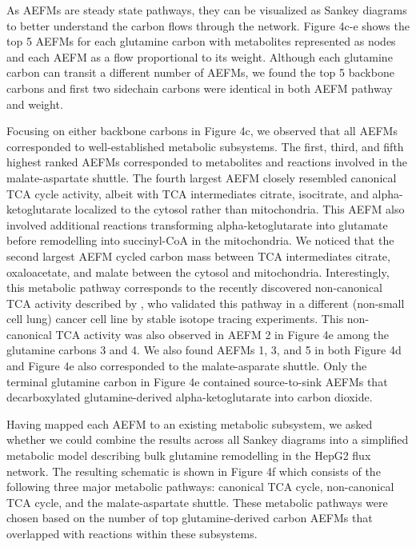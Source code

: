\documentclass[12pt]{article}
\begin{document}
As AEFMs are steady state pathways, they can be visualized as Sankey
diagrams to better understand the carbon flows through the network. Figure
4c-e shows the top 5 AEFMs for each glutamine carbon with metabolites
represented as nodes and each AEFM as a flow proportional to its weight.
Although each glutamine carbon can transit a different number of AEFMs, we
found the top 5 backbone carbons and first two sidechain carbons were
identical in both AEFM pathway and weight.
    
Focusing on either backbone carbons in Figure 4c, we observed that all
AEFMs corresponded to well-established metabolic subsystems. The first,
third, and fifth highest ranked AEFMs corresponded to metabolites and
reactions involved in the malate-aspartate shuttle. The fourth largest
AEFM closely resembled canonical TCA cycle activity, albeit with TCA
intermediates citrate, isocitrate, and alpha-ketoglutarate localized to
the cytosol rather than mitochondria. This AEFM also involved additional
reactions transforming alpha-ketoglutarate into glutamate before
remodelling into succinyl-CoA in the mitochondria. We noticed that the
second largest AEFM cycled carbon mass between TCA intermediates citrate,
oxaloacetate, and malate between the cytosol and mitochondria.
Interestingly, this metabolic pathway corresponds to the recently
discovered non-canonical TCA activity described by
\citeauthor{ArnoldPaigeK2022Anta}, who validated this pathway in
a different (non-small cell lung) cancer cell line by stable isotope
tracing experiments. This non-canonical TCA activity was also observed in
AEFM 2 in Figure 4e among the glutamine carbons 3 and 4. We also found
AEFMs 1, 3, and 5 in both Figure 4d and Figure 4e also corresponded to the
malate-asparate shuttle. Only the terminal glutamine carbon in Figure 4e
contained source-to-sink AEFMs that decarboxylated glutamine-derived
alpha-ketoglutarate into carbon dioxide.


Having mapped each AEFM to an existing metabolic subsystem, we asked whether we
could combine the results across all Sankey diagrams into a simplified
metabolic model describing bulk glutamine remodelling in the HepG2 flux
network. The resulting schematic is shown in Figure 4f which consists of
the following three major metabolic pathways: canonical TCA cycle,
non-canonical TCA cycle, and the malate-aspartate shuttle. These metabolic
pathways were chosen based on the number of top glutamine-derived carbon
AEFMs that overlapped with reactions within these subsystems. 
\end{document}
